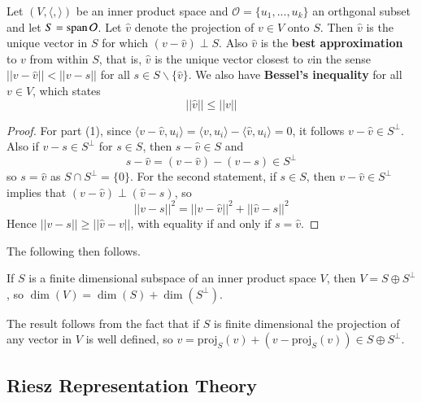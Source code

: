 \begin{theorem}
    Let $(V,\langle,\rangle)$ be an inner product space and $\mathcal{O} = \{u_1,...,u_k\}$ an orthgonal subset and let $S = \operatorname{span}\mathcal{O}$. Let $\hat{v}$ denote the projection of $v \in V$ onto $S$. Then $\hat{v}$ is the unique vector in $S$ for which $(v-\hat{v})\perp S$. Also $\hat{v}$ is the \textbf{best approximation} to $v$ from within $S$, that is, $\hat{v}$ is the unique vector closest to $v$in the sense $||v-\hat{v}|| < ||v-s||$ for all $s \in S\backslash\{\hat{v}\}$. We also have \textbf{Bessel's inequality} for all $v \in V$, which states \begin{equation*}
        ||\hat{v}||\leq ||v||
    \end{equation*}
\end{theorem}
\begin{proof}
    For part (1), since $\langle v-\hat{v},u_i\rangle = \langle v,u_i\rangle - \langle \hat{v},u_i\rangle = 0$, it follows $v-\hat{v} \in S^{\perp}$. Also if $v-s \in S^{\perp}$ for $s \in S$, then $s-\hat{v} \in S$ and \begin{equation*}
        s-\hat{v} = (v-\hat{v})-(v-s) \in S^{\perp}
    \end{equation*}
    so $s = \hat{v}$ as $S\cap S^{\perp} = \{0\}$. For the second statement, if $s \in S$, then $v-\hat{v} \in S^{\perp}$ implies that $(v-\hat{v})\perp(\hat{v}-s)$, so \begin{equation*}
        ||v-s||^2 = ||v-\hat{v}||^2+||\hat{v}-s||^2
    \end{equation*}
    Hence $||v-s||\geq ||\hat{v}-v||$, with equality if and only if $s = \hat{v}$.
\end{proof}

The following then follows.

\begin{theorem}
    If $S$ is a finite dimensional subspace of an inner product space $V$, then $V = S\oplus S^{\perp}$, so $\dim(V) = \dim(S)+\dim(S^{\perp})$.
\end{theorem}
The result follows from the fact that if $S$ is finite dimensional the projection of any vector in $V$ is well defined, so $v = \text{proj}_S(v) + (v-\text{proj}_S(v)) \in S\oplus S^{\perp}$.


\subsection{Riesz Representation Theory}

